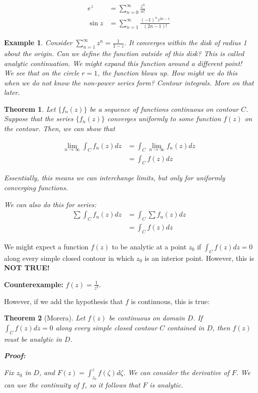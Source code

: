 \documentclass{article}
\newtheorem{theorem}{Theorem}[section]
\newtheorem{ex}{Example}
\theoremstyle{definition}
\begin{document}
\begin{align*}
e^z &= \sum_{n=0}^\infty \frac{z^n}{n!}\\
\sin z &= \sum_{n=1}^\infty \frac{(-1)^n z^{2n-1}}{(2n-1)!}
\end{align*}


\begin{ex}
Consider $\sum_{n=1}^\infty z^n = \frac{1}{1-z}$. It converges within the disk of radius 1 about the origin.  Can we define the function outside of this disk? This is called \textit{analytic continuation}. We might expand this function around a different point! We see that on the circle $r=1$, the function blows up. How might we do this when we do not know the non-power series form? Contour integrals. More on that later.
\end{ex}

\begin{theorem}
Let $\{f_n(z)\}$ be a sequence of functions continuous on contour $C$. Suppose that the series $\{f_n(z)\}$ converges uniformly to some function $f(z)$ on the contour. Then, we can show that

\begin{align*}
\lim_{n\to\infty} \int_{C} f_n(z) dz &= \int_{C} \lim_{n\to\infty} f_n(z) dz \\ 
&= \int_{C}f(z) dz
\end{align*}

Essentially, this means we can interchange limits, but only for uniformly converging functions.

We can also do this for series: 
\begin{align*}
\sum \int_{C} f_n(z) dz &= \int_{C} \sum f_n(z) dz \\ 
&= \int_{C}f(z) dz
\end{align*}
\end{theorem}

We might expect a function $f(z)$ to be analytic at a point $z_0$ if $\int_{C}f(z)dz = 0$ along every simple closed contour in which $z_0$ is an interior point. However, this is \textbf{NOT TRUE!} 

\textbf{Counterexample:} $f(z) = \frac{1}{z^2}$. 

However, if we add the hypothesis that $f$ is continuous, this is true:

\begin{theorem}[Morera]
Let $f(z)$ be continuous on domain $D$. If $\int_{C}f(z)dz = 0$ along every simple closed contour $C$ contained in $D$, then $f(z)$ must be analytic in $D$. 

\textbf{Proof:}

Fix $z_0$ in $D$, and $F(z) = \int_{z_0}^{z} f(\zeta) d\zeta$. We can consider the derivative of $F$. We can use the continuity of $f$, so it follows that $F$ is analytic.

\end{theorem}
\end{document}
